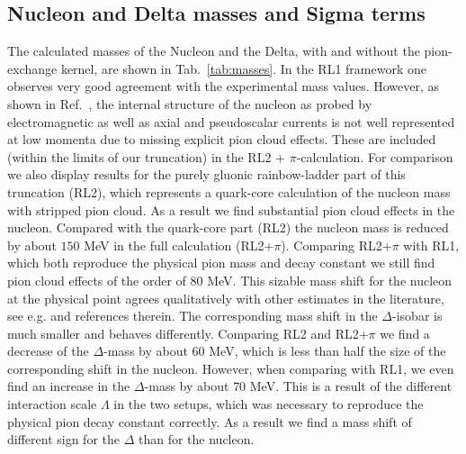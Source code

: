 \subsection*{Nucleon and Delta masses and Sigma terms}

The calculated masses of the Nucleon and the Delta, with and without the 
pion-exchange kernel, are shown in Tab.~\ref{tab:masses}. In the RL1 framework
one observes very good agreement with the experimental 
mass values. However, as shown in Ref.~\cite{Eichmann:2011vu,Eichmann:2011pv}, the 
internal structure of the nucleon as probed by electromagnetic as well as axial 
and pseudoscalar currents is not well represented at low momenta due
to missing explicit pion cloud effects. These are included (within the limits of 
our truncation) in the RL2 + $\pi$-calculation. For comparison we also display 
results for the purely gluonic rainbow-ladder part of this truncation (RL2), which
represents a quark-core calculation of the nucleon mass with stripped pion cloud.
As a result we find substantial pion cloud effects in the nucleon. Compared with 
the quark-core part (RL2) the nucleon mass is reduced by about $150$ MeV in the 
full calculation (RL2+$\pi$). Comparing RL2+$\pi$ with RL1, which both reproduce
the physical pion mass and decay constant we still find pion cloud effects of the
order of $80$ MeV. This sizable mass shift for the nucleon at the physical
point agrees qualitatively with other estimates in the literature, see e.g. 
\cite{Young:2002cj} and references therein. The corresponding mass shift in the
$\Delta$-isobar is much smaller and behaves differently. Comparing RL2 and RL2+$\pi$
we find a decrease of the $\Delta$-mass by about $60$ MeV, which is less than half
the size of the corresponding shift in the nucleon. However, when comparing with
RL1, we even find an increase in the $\Delta$-mass by about $70$ MeV. This is a
result of the different interaction scale $\Lambda$ in the two setups, which
was necessary to reproduce the physical pion decay constant correctly. As a result
we find a mass shift of different sign for the $\Delta$ than for the nucleon.

